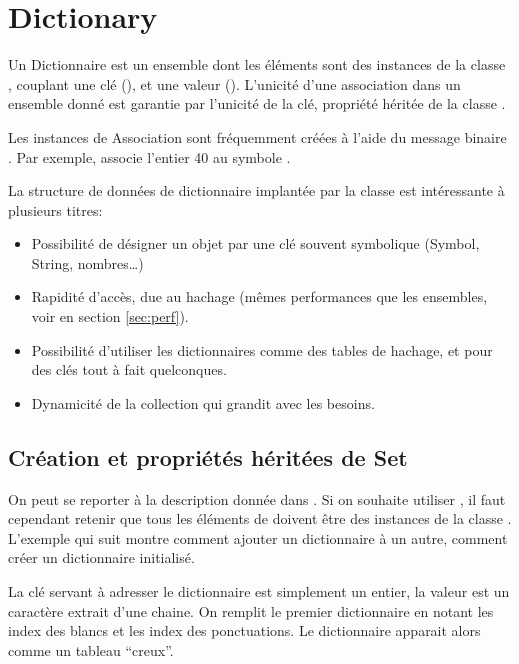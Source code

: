 \section{Dictionary}

Un Dictionnaire est un ensemble dont les \'el\'ements sont des instances
de la classe , couplant une cl\'e (), et une valeur
(). L'unicit\'e d'une association dans un ensemble donn\'e est garantie
par l'unicit\'e de la cl\'e, propri\'et\'e h\'erit\'ee de la classe .

Les instances de Association sont fr\'equemment cr\'e\'ees \`a l'aide du message
binaire \assoc. Par exemple,  associe l'entier 40
au symbole .

La structure de donn\'ees de dictionnaire implant\'ee par la classe  est int\'eressante \`a plusieurs titres:

\begin{itemize}
\item Possibilit\'e de d\'esigner un objet par une cl\'e souvent symbolique
(Symbol, String, nombres\ldots)
\item Rapidit\'e d'acc\`es, due au hachage (m\^emes performances que
les ensembles, voir en  section \ref{sec:perf}).
\item Possibilit\'e d'utiliser les dictionnaires comme des tables de hachage,
et pour des cl\'es tout \`a fait quelconques.
\item Dynamicit\'e de la collection qui grandit avec les besoins.
\end{itemize}

\subsection { Cr\'eation et propri\'et\'es h\'erit\'ees de Set}

On peut se reporter \`a la description donn\'ee dans . Si on souhaite utiliser , il faut cependant retenir que tous les \'el\'ements de  doivent \^etre des instances de la classe . L'exemple qui suit montre comment ajouter un dictionnaire \`a un autre, comment cr\'eer un dictionnaire initialis\'e.

La cl\'e servant \`a adresser le dictionnaire est simplement un entier, la valeur est un caract\`ere extrait d'une chaine. On remplit le premier dictionnaire en notant les index des blancs et les index des ponctuations. Le dictionnaire apparait alors comme un tableau ``creux''.

